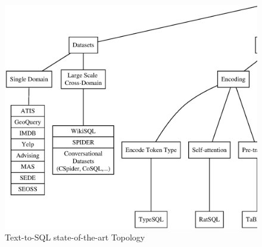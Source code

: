 
\begin{figure}
    \centering
    \includegraphics[width=1\linewidth]{pics/mindmap/mind}
    \caption{Text-to-SQL state-of-the-art Topology}
    \label{fig:mindmap}
\end{figure}